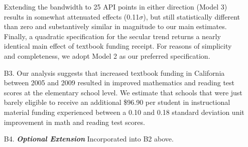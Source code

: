 \documentclass[a4paper, 11pt]{article}
\begin{document}
\begin{enumerate}
	Extending the bandwidth to 25 API points in either direction (Model 3) results in somewhat attenuated effects (0.11$\sigma$), but still statistically different than zero and substantively similar in magnitude to our main estimates. Finally, a quadratic specification for the secular trend returns a nearly identical main effect of textbook funding receipt. For reasons of simplicity and completeness, we adopt Model 2 as our preferred specification.



	\item[B3.] Our analysis suggests that increased textbook funding in California between 2005 and 2009 resulted in improved mathematics and reading test scores at the elementary school level. We estimate that schools that were just barely eligible to receive an additional \$96.90 per student in instructional material funding experienced between a 0.10 and 0.18 standard deviation unit improvement in math and reading test scores. 

	\item[B4.] \textbf{\textit{Optional Extension}} Incorporated into B2 above.


\end{enumerate}
\end{document}
